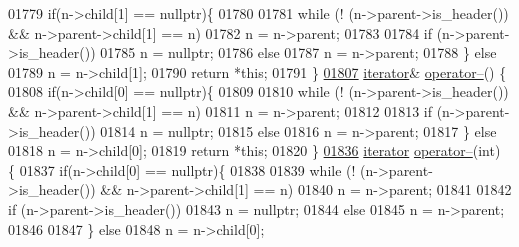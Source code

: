 \begin{DoxyCode}
01779             \textcolor{keywordflow}{if}(n->child[1] == \textcolor{keyword}{nullptr})\{
01780 
01781                 \textcolor{keywordflow}{while} (! (n->parent->is\_header()) &&  n->parent->child[1] == n)
01782                     n = n->parent;
01783             
01784                \textcolor{keywordflow}{if} (n->parent->is\_header())
01785                 n = \textcolor{keyword}{nullptr};
01786             \textcolor{keywordflow}{else}
01787                 n = n->parent;
01788         \} \textcolor{keywordflow}{else}
01789             n = n->child[1];
01790         \textcolor{keywordflow}{return} *\textcolor{keyword}{this};
01791         \}
\hypertarget{map3_8h_source_l01807}{}\hyperlink{classaed2_1_1map_1_1iterator_ae7f70f71545d2a9de17b65edaaec748a_ae7f70f71545d2a9de17b65edaaec748a}{01807}         \hyperlink{classaed2_1_1map_1_1iterator}{iterator}& \hyperlink{classaed2_1_1map_1_1iterator_ae7f70f71545d2a9de17b65edaaec748a_ae7f70f71545d2a9de17b65edaaec748a}{operator--}() \{
01808             \textcolor{keywordflow}{if}(n->child[0] == \textcolor{keyword}{nullptr})\{
01809 
01810                 \textcolor{keywordflow}{while} (! (n->parent->is\_header()) &&  n->parent->child[1] == n)
01811                     n = n->parent;
01812             
01813             \textcolor{keywordflow}{if} (n->parent->is\_header())
01814                 n = \textcolor{keyword}{nullptr};
01815             \textcolor{keywordflow}{else}
01816                 n = n->parent;
01817             \} \textcolor{keywordflow}{else}
01818                 n = n->child[0];
01819         \textcolor{keywordflow}{return} *\textcolor{keyword}{this};
01820         \}
\hypertarget{map3_8h_source_l01836}{}\hyperlink{classaed2_1_1map_1_1iterator_add45e9ddbb8eeda99326cdb9ac9dd225_add45e9ddbb8eeda99326cdb9ac9dd225}{01836}         \hyperlink{classaed2_1_1map_1_1iterator}{iterator} \hyperlink{classaed2_1_1map_1_1iterator_add45e9ddbb8eeda99326cdb9ac9dd225_add45e9ddbb8eeda99326cdb9ac9dd225}{operator--}(\textcolor{keywordtype}{int}) \{
01837             \textcolor{keywordflow}{if}(n->child[0] == \textcolor{keyword}{nullptr})\{
01838 
01839                \textcolor{keywordflow}{while} (! (n->parent->is\_header()) &&  n->parent->child[1] == n)
01840                    n = n->parent;
01841             
01842             \textcolor{keywordflow}{if} (n->parent->is\_header())
01843                 n = \textcolor{keyword}{nullptr};
01844             \textcolor{keywordflow}{else}
01845                 n = n->parent;
01846            
01847            \} \textcolor{keywordflow}{else}
01848             n = n->child[0];

\end{DoxyCode}
